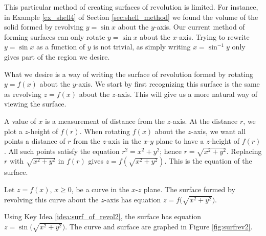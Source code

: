 
This particular method of creating surfaces of revolution is limited. For instance, in Example \ref{ex_shell4} of Section \ref{sec:shell_method} we found the volume  of the solid formed by revolving $y=\sin x$ about the $y$-axis. Our current method of forming surfaces can only rotate $y=\sin x$ about the $x$-axis. Trying to rewrite $y=\sin x$ as a function of $y$ is not trivial, as simply writing $x=\sin^{-1}y$ only gives part of the region we desire.

What we desire is a way of writing the surface of revolution formed by rotating $y=f(x)$ about the $y$-axis. We start by first recognizing this surface is the same as revolving $z=f(x)$ about the $z$-axis. This will give us a more natural way of viewing the surface. 

A value of $x$ is a measurement of distance from the $z$-axis. At the distance $r$, we plot a $z$-height of $f(r)$. When rotating $f(x)$ about the $z$-axis, we want all points a distance of $r$ from the $z$-axis in the $x$-$y$ plane to have a $z$-height of $f(r)$. All such points satisfy the equation $r^2=x^2+y^2$; hence $r=\sqrt{x^2+y^2}$. Replacing $r$ with $\sqrt{x^2+y^2}$ in $f(r)$ gives $z=f(\sqrt{x^2+y^2})$. This is the equation of the surface.

{Let $z=f(x)$, $x\geq 0$, be a curve in the $x$-$z$ plane. The surface formed by revolving this curve about the $z$-axis has equation $z=f\big(\sqrt{x^2+y^2}\big)$.
}

{Using Key Idea \ref{idea:surf_of_revol2}, the surface has equation $z=\sin\big(\sqrt{x^2+y^2}\big)$. The curve and surface are graphed in Figure \ref{fig:surfrev2}.
}\\

